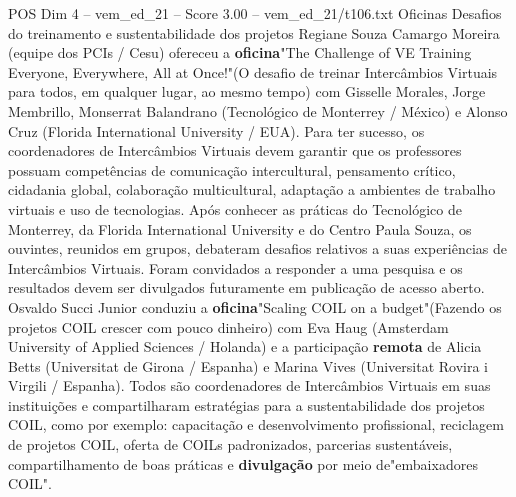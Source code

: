 \begin{textsample}{POS Dim 4 – vem\_ed\_21 – Score 3.00 – vem\_ed\_21/t106.txt}  \label{ex:f4_pos_099}
Oficinas Desafios do treinamento e sustentabilidade dos projetos Regiane Souza Camargo Moreira (equipe dos PCIs / Cesu) ofereceu a \textbf{oficina}"The Challenge of VE Training Everyone, Everywhere, All at Once!"(O desafio de treinar Intercâmbios Virtuais para todos, em qualquer lugar, ao mesmo tempo) com Gisselle Morales, Jorge Membrillo, Monserrat Balandrano (Tecnológico de Monterrey / México) e Alonso Cruz (Florida International University / EUA).
Para ter sucesso, os coordenadores de Intercâmbios Virtuais devem garantir que os professores possuam competências de comunicação intercultural, pensamento crítico, cidadania global, colaboração multicultural, adaptação a ambientes de trabalho virtuais e uso de tecnologias.
Após conhecer as práticas do Tecnológico de Monterrey, da Florida International University e do Centro Paula Souza, os ouvintes, reunidos em grupos, debateram desafios relativos a suas experiências de Intercâmbios Virtuais.
Foram convidados a responder a uma pesquisa e os resultados devem ser divulgados futuramente em publicação de acesso aberto.
Osvaldo Succi Junior conduziu a \textbf{oficina}"Scaling COIL on a budget"(Fazendo os projetos COIL crescer com pouco dinheiro) com Eva Haug (Amsterdam University of Applied Sciences / Holanda) e a participação \textbf{remota} de Alicia Betts (Universitat de Girona / Espanha) e Marina Vives (Universitat Rovira i Virgili / Espanha).
Todos são coordenadores de Intercâmbios Virtuais em suas instituições e compartilharam estratégias para a sustentabilidade dos projetos COIL, como por exemplo: capacitação e desenvolvimento profissional, reciclagem de projetos COIL, oferta de COILs padronizados, parcerias sustentáveis, compartilhamento de boas práticas e \textbf{divulgação} por meio de"embaixadores COIL".

\end{textsample}
